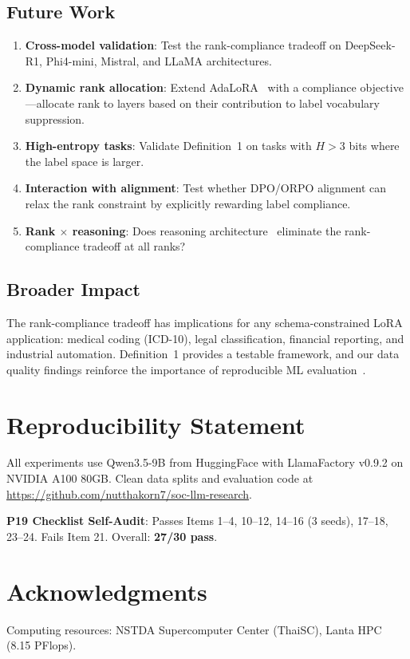 \documentclass[journal]{IEEEtran}
\begin{document}
\subsection{Future Work}
\begin{enumerate}
\item \textbf{Cross-model validation}: Test the rank-compliance tradeoff on DeepSeek-R1, Phi4-mini, Mistral, and LLaMA architectures.
\item \textbf{Dynamic rank allocation}: Extend AdaLoRA~\cite{zhang2023} with a compliance objective---allocate rank to layers based on their contribution to label vocabulary suppression.
\item \textbf{High-entropy tasks}: Validate Definition~1 on tasks with $H > 3$ bits where the label space is larger.
\item \textbf{Interaction with alignment}: Test whether DPO/ORPO alignment can relax the rank constraint by explicitly rewarding label compliance.
\item \textbf{Rank $\times$ reasoning}: Does reasoning architecture~\cite{p21} eliminate the rank-compliance tradeoff at all ranks?
\end{enumerate}

\subsection{Broader Impact}
The rank-compliance tradeoff has implications for any schema-constrained LoRA application: medical coding (ICD-10), legal classification, financial reporting, and industrial automation. Definition~1 provides a testable framework, and our data quality findings reinforce the importance of reproducible ML evaluation~\cite{kapoor2023}.

\section*{Reproducibility Statement}
All experiments use Qwen3.5-9B from HuggingFace with LlamaFactory v0.9.2 on NVIDIA A100 80GB. Clean data splits and evaluation code at \url{https://github.com/nutthakorn7/soc-llm-research}.

\noindent\textbf{P19 Checklist Self-Audit}: Passes Items 1--4, 10--12, 14--16 (3 seeds), 17--18, 23--24. Fails Item 21. Overall: \textbf{27/30 pass}.

\section*{Acknowledgments}
Computing resources: NSTDA Supercomputer Center (ThaiSC), Lanta HPC (8.15 PFlops).
\end{document}
